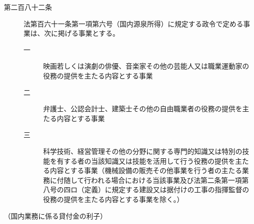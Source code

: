 \documentclass[twocolumn,a4j,10pt]{ltjtarticle}
\begin{document}
\begin{description}
\item[第二百八十二条]法第百六十一条第一項第六号（国内源泉所得）に規定する政令で定める事業は、次に掲げる事業とする。
\begin{description}
\item[一]映画若しくは演劇の俳優、音楽家その他の芸能人又は職業運動家の役務の提供を主たる内容とする事業
\item[二]弁護士、公認会計士、建築士その他の自由職業者の役務の提供を主たる内容とする事業
\item[三]科学技術、経営管理その他の分野に関する専門的知識又は特別の技能を有する者の当該知識又は技能を活用して行う役務の提供を主たる内容とする事業（機械設備の販売その他事業を行う者の主たる業務に付随して行われる場合における当該事業及び法第二条第一項第八号の四ロ（定義）に規定する建設又は据付けの工事の指揮監督の役務の提供を主たる内容とする事業を除く。）
\end{description}
\end{description}
\noindent\hspace{10pt}（国内業務に係る貸付金の利子）
\end{document}
